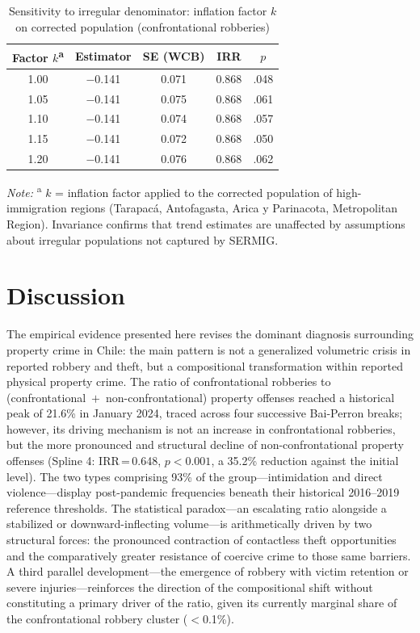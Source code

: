 \documentclass[pdflatex,sn-basic]{sn-jnl}
\newcommand{\tablenote}[1]{%
  \vspace{2pt}%
  {\par\footnotesize\textit{Note:} #1\par}%
}
\begin{document}
\begin{table}[htbp]
\centering
\caption{Sensitivity to irregular denominator: inflation factor $k$ on corrected population (confrontational robberies)}
\label{tab:sensipop}
\footnotesize
\begin{tabular}{ccccc}
\toprule
\textbf{Factor $k$}\textsuperscript{a} & \textbf{Estimator} & \textbf{SE (WCB)} & \textbf{IRR} & $p$ \\
\midrule
1.00 & $-$0.141 & 0.071 & 0.868 & .048 \\
1.05 & $-$0.141 & 0.075 & 0.868 & .061 \\
1.10 & $-$0.141 & 0.074 & 0.868 & .057 \\
1.15 & $-$0.141 & 0.072 & 0.868 & .050 \\
1.20 & $-$0.141 & 0.076 & 0.868 & .062 \\
\bottomrule
\end{tabular}
\tablenote{\textsuperscript{a} $k$ = inflation factor applied to the corrected population of high-immigration regions (Tarapac\'a, Antofagasta, Arica y Parinacota, Metropolitan Region). Invariance confirms that trend estimates are unaffected by assumptions about irregular populations not captured by SERMIG.}
\end{table}

\section{Discussion}
\label{sec:discusion}

The empirical evidence presented here revises the dominant diagnosis surrounding property crime in Chile: the main pattern is not a generalized volumetric crisis in reported robbery and theft, but a compositional transformation within reported physical property crime. The ratio of confrontational robberies to (confrontational~$+$~non-confrontational) property offenses reached a historical peak of 21.6\% in January 2024, traced across four successive Bai-Perron breaks; however, its driving mechanism is not an increase in confrontational robberies, but the more pronounced and structural decline of non-confrontational property offenses (Spline 4: IRR\,=\,0.648, $p<0.001$, a 35.2\% reduction against the initial level). The two types comprising 93\% of the group---intimidation and direct violence---display post-pandemic frequencies beneath their historical 2016--2019 reference thresholds. The statistical paradox---an escalating ratio alongside a stabilized or downward-inflecting volume---is arithmetically driven by two structural forces: the pronounced contraction of contactless theft opportunities and the comparatively greater resistance of coercive crime to those same barriers. A third parallel development---the emergence of robbery with victim retention or severe injuries---reinforces the direction of the compositional shift without constituting a primary driver of the ratio, given its currently marginal share of the confrontational robbery cluster ($<$0.1\%).
\end{document}
